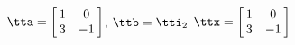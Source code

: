 {$\tta = \left[\hskip -3pt \begin{array}{cc} 1&0 \\    3&-1  \end{array}\hskip -3pt \right] $, 
 \quad
$\ttb=\tti_2 $}
{$\ttx=\left[\hskip -3pt \begin{array}{cc} 1&0 \\    3&-1  \end{array}\hskip -3pt \right] $}
